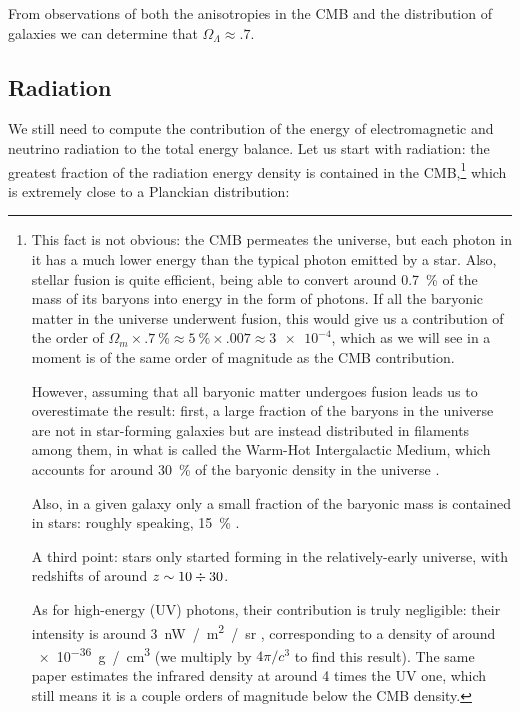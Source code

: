 \documentclass[main.tex]{subfiles}
\begin{document}
From observations of both the anisotropies in the CMB and the distribution of galaxies we can determine that \(\Omega_{\Lambda } \approx \num{.7}\).


\subsection{Radiation}

We still need to compute the contribution of the energy of electromagnetic and neutrino radiation to the total energy balance.
Let us start with radiation: the greatest fraction of the radiation energy density is contained in the CMB,\footnote{This fact is not obvious: the CMB permeates the universe, but each photon in it has a much lower energy than the typical photon emitted by a star.
Also, stellar fusion is quite efficient, being able to convert around \SI{0.7}{\percent} of the mass of its baryons into energy in the form of photons. If all the baryonic matter in the universe underwent fusion, this would give us a contribution of the order of \(\Omega_m \times \SI{.7}{\percent} \approx \SI{5}{\percent} \times \num{.007} \approx \num{3e-4}\), which as we will see in a moment is of the same order of magnitude as the CMB contribution.

However, assuming that all baryonic matter undergoes fusion leads us to overestimate the result: first, a large fraction of the baryons in the universe are not in star-forming galaxies but are instead distributed in filaments among them, in what is called the Warm-Hot Intergalactic Medium, which accounts for around \SI{30}{\percent} of the baryonic density in the universe \cite[]{degraaffProbingMissingBaryons2019}. 

Also, in a given galaxy only a small fraction of the baryonic mass is contained in stars: roughly speaking, \SI{15}{\percent} \cite[fig.\ 11]{andreonStellarMassFraction2010}. 

A third point: stars only started forming in the relatively-early universe, with redshifts of around \(z \sim 10 \divisionsymbol 30\). 

As for high-energy (UV) photons, their contribution is truly negligible: their intensity is around \SI{3}{nW / m^2 / sr} \cite[page 2]{collaborationGammarayDeterminationUniverse2018}, corresponding to a density of around \SI{e-36}{g / cm^3} (we multiply by \(4 \pi / c^3\) to find this result). The same paper estimates the infrared density at around 4 times the UV one, which still means it is a couple orders of magnitude below the CMB density.
} which is extremely close to a Planckian distribution: 
\end{document}
